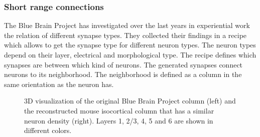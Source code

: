 \documentclass[a4paper]{article}
\begin{document}
   
\subsubsection{Short range connections}
The Blue Brain Project has investigated over the last years in experiential work the relation of different synapse types.
They collected their findings in a recipe which allows to get the synapse type for different neuron types.
The neuron types depend on their layer, electrical and morphological type. The recipe defines which synapses are between 
which kind of neurons. The generated synapses connect neurons to its neighborhood. The neighborhood is defined as a
column in the same orientation as the neuron has.


\begin{figure}[ht!]
   	\begin{center}
        \hspace{0.5cm}
        \hspace{0.5cm}
  
    	   \end{center}
    	\caption{%
        3D visualization of the original Blue Brain Project column (left) and the reconstructed mouse
isocortical column that has a similar neuron density (right). Layers 1, 2/3, 4, 5 and 6 are
shown in different colors.
     }%
   \label{fig:atlas}
   \end{figure}
   
\end{document}
